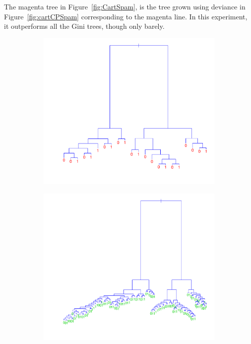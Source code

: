 The magenta tree in Figure~\ref{fig:CartSpam}, is the tree grown using deviance in Figure~\ref{fig:cartCPSpam} corresponding to the magenta line. In this experiment, it outperforms all the Gini trees, though only barely. 

\begin{figure}[htb]
  \centering
  \begin{subfigure}[b]{0.48\textwidth}
    \includegraphics[width=\textwidth]{./figures/cartSmallSpam.pdf}
  \end{subfigure}%
  \quad
  \begin{subfigure}[b]{0.48\textwidth}
    \includegraphics[width=\textwidth]{./figures/cartOptSpam.pdf}

\end{subfigure}
\end{figure}
